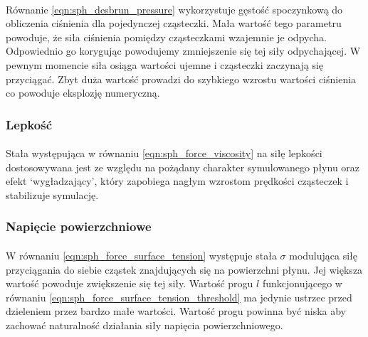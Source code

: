 \paragraph{}
Równanie \eqref{eqn:sph_desbrun_pressure} wykorzystuje gęstość spoczynkową do obliczenia ciśnienia dla pojedynczej cząsteczki. Mała wartość tego parametru powoduje, że siła ciśnienia pomiędzy cząsteczkami wzajemnie je odpycha. Odpowiednio go korygując powodujemy zmniejszenie się tej siły odpychającej. W pewnym momencie siła osiąga wartości ujemne i cząsteczki zaczynają się przyciągać. Zbyt duża wartość prowadzi do szybkiego wzrostu wartości ciśnienia co powoduje eksplozję numeryczną.
\par

\subsubsection{Lepkość}

\paragraph{}
Stała występująca w równaniu \eqref{eqn:sph_force_viscosity} na siłę lepkości dostosowywana jest ze względu na pożądany charakter symulowanego płynu oraz efekt `wygładzający', który zapobiega nagłym wzrostom prędkości cząsteczek i stabilizuje symulację.
\par

\subsubsection{Napięcie powierzchniowe}

\paragraph{}
W równaniu \eqref{eqn:sph_force_surface_tension} występuje stała $\sigma$ modulująca siłę przyciągania do siebie cząstek znajdujących się na powierzchni płynu. Jej większa wartość powoduje zwiększenie się tej siły.
Wartość progu $l$ funkcjonującego w równaniu \eqref{eqn:sph_force_surface_tension_threshold} ma jedynie ustrzec przed dzieleniem przez bardzo małe wartości. Wartość progu powinna być niska aby zachować naturalność działania siły napięcia powierzchniowego.
\par